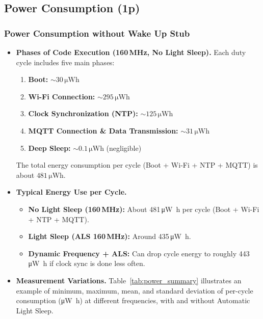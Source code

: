 \documentclass[A4,10pt]{article}
\begin{document}
 
\subsection{Power Consumption (1p)}
\label{sec:power_consumption}

\subsubsection{Power Consumption without Wake Up Stub}

\begin{itemize}
    \item \textbf{Phases of Code Execution (160\,MHz, No Light Sleep).} Each duty cycle includes five main phases:
    \begin{enumerate}
      \item \textbf{Boot:} \(\sim 30\,\si{\micro\watt\hour}\)
      \item \textbf{Wi-Fi Connection:} \(\sim 295\,\si{\micro\watt\hour}\)
      \item \textbf{Clock Synchronization (NTP):} \(\sim 125\,\si{\micro\watt\hour}\)
      \item \textbf{MQTT Connection \& Data Transmission:} \(\sim 31\,\si{\micro\watt\hour}\)
      \item \textbf{Deep Sleep:} \(\sim 0.1\,\si{\micro\watt\hour}\) (negligible)
    \end{enumerate}
    \noindent The total energy consumption per cycle (Boot + Wi-Fi + NTP + MQTT) is about \(481\,\si{\micro\watt\hour}\).
    
  \item \textbf{Typical Energy Use per Cycle.}
    \begin{itemize}
      \item \textbf{No Light Sleep (160\,MHz):} About 481\,\si{\micro\watt\hour} per cycle (Boot + Wi-Fi + NTP + MQTT).
      \item \textbf{Light Sleep (ALS 160\,MHz):} Around 435\,\si{\micro\watt\hour}.
      \item \textbf{Dynamic Frequency + ALS:} Can drop cycle energy to roughly 443\,\si{\micro\watt\hour} if clock sync is done less often.
    \end{itemize}

  \item \textbf{Measurement Variations.}
  Table~\ref{tab:power_summary} illustrates an example of minimum, maximum, mean, and standard deviation of per-cycle consumption (\si{\micro\watt\hour}) at different frequencies, with and without Automatic Light Sleep.


\end{itemize}
\end{document}
